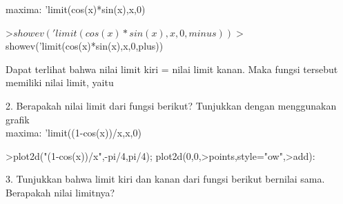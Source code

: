 \documentclass[a4paper,10pt]{article}
\begin{document}
\begin{eulernotebook}
\begin{eulercomment}
\begin{eulercomment}
\begin{eulercomment}
\begin{eulercomment}
\begin{eulercomment}
\begin{eulercomment}
\begin{eulercomment}
\begin{eulercomment}
\begin{eulercomment}
\begin{eulercomment}
\begin{eulercomment}
\begin{eulercomment}
\begin{eulercomment}
\begin{eulercomment}
\begin{eulercomment}
\begin{eulercomment}
\begin{eulercomment}
\begin{eulercomment}
\begin{eulercomment}
\begin{eulercomment}
\begin{eulercomment}
maxima: 'limit(cos(x)*sin(x),x,0)
\end{eulercomment}
\begin{eulerprompt}
>$showev('limit(cos(x)*sin(x),x,0,minus))
>$showev('limit(cos(x)*sin(x),x,0,plus))
\end{eulerprompt}
\begin{eulercomment}
Dapat terlihat bahwa nilai limit kiri = nilai limit kanan. Maka fungsi
tersebut memiliki nilai limit, yaitu
\end{eulercomment}
\begin{eulercomment}
2. Berapakah nilai limit dari fungsi berikut? Tunjukkan dengan
menggunakan grafik\\
maxima: 'limit((1-cos(x))/x,x,0)
\end{eulercomment}
\begin{eulerprompt}
>plot2d("(1-cos(x))/x",-pi/4,pi/4); plot2d(0,0,>points,style="ow",>add):
\end{eulerprompt}
\begin{eulercomment}
3. Tunjukkan bahwa limit kiri dan kanan dari fungsi berikut bernilai
sama. Berapakah nilai limitnya?


\end{eulercomment}
\end{eulercomment}
\end{eulercomment}
\end{eulercomment}
\end{eulercomment}
\end{eulercomment}
\end{eulercomment}
\end{eulercomment}
\end{eulercomment}
\end{eulercomment}
\end{eulercomment}
\end{eulercomment}
\end{eulercomment}
\end{eulercomment}
\end{eulercomment}
\end{eulercomment}
\end{eulercomment}
\end{eulercomment}
\end{eulercomment}
\end{eulercomment}
\end{eulercomment}
\end{eulernotebook}
\end{document}
